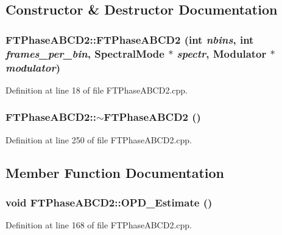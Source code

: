 \subsection{Constructor \& Destructor Documentation}
\hypertarget{classFTPhaseABCD2_ad221cbcea6aae7dc1ee5b781c17bba81}{
\subsubsection[{FTPhaseABCD2}]{\setlength{\rightskip}{0pt plus 5cm}FTPhaseABCD2::FTPhaseABCD2 (int {\em nbins}, \/  int {\em frames\_\-per\_\-bin}, \/  {\bf SpectralMode} $\ast$ {\em spectr}, \/  {\bf Modulator} $\ast$ {\em modulator})}}
\label{classFTPhaseABCD2_ad221cbcea6aae7dc1ee5b781c17bba81}


Definition at line 18 of file FTPhaseABCD2.cpp.

\hypertarget{classFTPhaseABCD2_aa873d8d953ee9ae65b02962ee59c3705}{
\subsubsection[{$\sim$FTPhaseABCD2}]{\setlength{\rightskip}{0pt plus 5cm}FTPhaseABCD2::$\sim$FTPhaseABCD2 ()}}
\label{classFTPhaseABCD2_aa873d8d953ee9ae65b02962ee59c3705}


Definition at line 250 of file FTPhaseABCD2.cpp.



\subsection{Member Function Documentation}
\hypertarget{classFTPhaseABCD2_a1f9794309bdfae8ea7c5f57682b89dbf}{
\subsubsection[{OPD\_\-Estimate}]{\setlength{\rightskip}{0pt plus 5cm}void FTPhaseABCD2::OPD\_\-Estimate ()}}
\label{classFTPhaseABCD2_a1f9794309bdfae8ea7c5f57682b89dbf}


Definition at line 168 of file FTPhaseABCD2.cpp.


